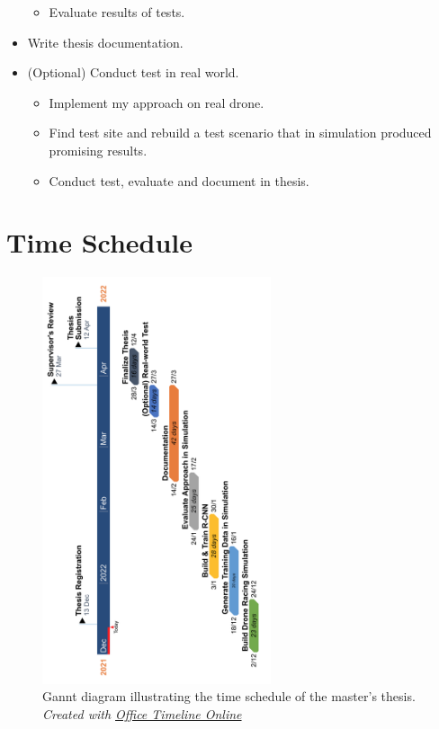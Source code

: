\begin{itemize}
\begin{itemize}
		\item Evaluate results of tests.
	\end{itemize}
	\item Write thesis documentation.
	\item (Optional) Conduct test in real world.
	\begin{itemize}
		\item Implement my approach on real drone.
		\item Find test site and rebuild a test scenario that in simulation produced promising results.
		\item Conduct test, evaluate and document in thesis.
	\end{itemize} 
 
\end{itemize}

	
\chapter{Time Schedule}

\begin{figure}[H]
    \centering
    \includegraphics[width=0.6\textwidth]{figures/Timeline.png}
    \caption[Gannt diagram illustrating the time schedule of the master's thesis.]{Gannt diagram illustrating the time schedule of the master's thesis. \textit{Created with \href{https://online.officetimeline.com/}{Office Timeline Online}}}
    \label{fig:Timeline}
\end{figure}

